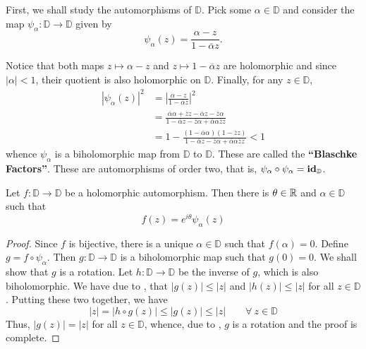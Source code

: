 First, we shall study the automorphisms of $\mathbb D$. Pick some $\alpha\in\mathbb D$ and consider the map $\psi_\alpha:\mathbb D\to\mathbb D$ given by
\begin{equation*}
    \psi_\alpha(z) = \frac{\alpha - z}{1 - \overline{\alpha}z}.
\end{equation*}

Notice that both maps $z\mapsto\alpha - z$ and $z\mapsto 1 - \overline{\alpha}z$ are holomorphic and since $|\alpha| < 1$, their quotient is also holomorphic on $\mathbb D$. Finally, for any $z\in\mathbb D$, 
\begin{align*}
    |\psi_\alpha(z)|^2 &= \left|\frac{\alpha - z}{1 - \overline{\alpha}z}\right|^2\\
    &= \frac{\overline\alpha\alpha + \overline zz - \overline\alpha z - \overline z\alpha}{1 - \overline\alpha z - \overline z\alpha + \overline\alpha\alpha\overline zz}\\
    &= 1 - \frac{(1 - \overline\alpha\alpha)(1 - \overline zz)}{1 - \overline\alpha z - \overline z\alpha + \overline\alpha\alpha\overline zz} < 1
\end{align*}
whence $\psi_\alpha$ is a biholomorphic map from $\mathbb D$ to $\mathbb D$. These are called the \textbf{``Blaschke Factors''}. These are automorphisms of order two, that is, $\psi_\alpha\circ\psi_\alpha = \mathbf{id}_{\mathbb D}$.

\begin{theorem}
    Let $f:\mathbb D\to\mathbb D$ be a holomorphic automorphism. Then there is $\theta\in\mathbb{R}$ and $\alpha\in\mathbb D$ such that 
    \begin{equation*}
        f(z) = e^{i\theta}\psi_\alpha(z)
    \end{equation*}
\end{theorem}
\begin{proof}
    Since $f$ is bijective, there is a unique $\alpha\in\mathbb D$ such that $f(\alpha) = 0$. Define $g = f\circ\psi_\alpha$. Then $g:\mathbb D\to\mathbb D$ is a biholomorphic map such that $g(0) = 0$. We shall show that $g$ is a rotation. Let $h:\mathbb D\to\mathbb D$ be the inverse of $g$, which is also biholomorphic. We have due to , that $|g(z)|\le|z|$ and $|h(z)|\le|z|$ for all $z\in\mathbb D$. Putting these two together, we have 
    \begin{equation*}
        |z| = |h\circ g(z)|\le |g(z)|\le|z|\qquad\forall~z\in\mathbb D
    \end{equation*}
    Thus, $|g(z)| = |z|$ for all $z\in\mathbb D$, whence, due to , $g$ is a rotation and the proof is complete.
\end{proof}

